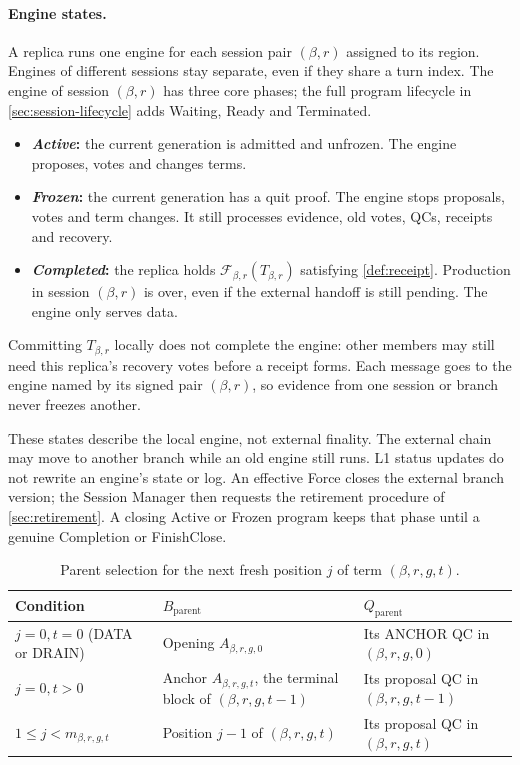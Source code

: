 \documentclass[11pt,a4paper]{article}
\newcommand{\FC}{\mathcal F}
\newcommand{\defterm}[1]{\textcolor{rrBlue}{\textit{#1}}}
\begin{document}
\paragraph{Engine states.}
A replica runs one engine for each session pair $(\beta,r)$ assigned to
its region. Engines of different sessions stay separate, even if they
share a turn index. The engine of session $(\beta,r)$ has three core
phases; the full program lifecycle in \cref{sec:session-lifecycle} adds
Waiting, Ready and Terminated.
\begin{itemize}
\item \textbf{\defterm{Active}:} the current generation is admitted and
unfrozen. The engine proposes, votes and changes terms.
\item \textbf{\defterm{Frozen}:} the current generation has a quit proof.
The engine stops proposals, votes and term changes. It still processes
evidence, old votes, QCs, receipts and recovery.
\item \textbf{\defterm{Completed}:} the replica holds
$\FC_{\beta,r}(T_{\beta,r})$ satisfying \cref{def:receipt}. Production in
session $(\beta,r)$ is over, even if the external handoff is still
pending. The engine only serves data.
\end{itemize}
Committing $T_{\beta,r}$ locally does not complete the engine: other
members may still need this replica's recovery votes before a receipt
forms. Each message goes to the engine named by its signed pair
$(\beta,r)$, so evidence from one session or branch never freezes
another.

These states describe the local engine, not external finality. The
external chain may move to another branch while an old engine still
runs. L1 status updates do not rewrite an engine's state or log. An
effective Force closes the external branch version; the Session Manager
then requests the retirement procedure of \cref{sec:retirement}. A
closing Active or Frozen program keeps that phase until a genuine
Completion or FinishClose.

\begin{table}[htbp]\centering\small
\caption{Parent selection for the next fresh position $j$ of term $(\beta,r,g,t)$.}
\label{tab:parent}
\begin{tabularx}{\linewidth}{@{}l Y Y@{}}
\toprule
Condition & $B_{\mathrm{parent}}$ & $Q_{\mathrm{parent}}$\\
\midrule
$j=0,t=0$ (DATA or DRAIN) & Opening $A_{\beta,r,g,0}$ & Its ANCHOR QC in $(\beta,r,g,0)$\\
$j=0,t>0$ & Anchor $A_{\beta,r,g,t}$, the terminal block of $(\beta,r,g,t-1)$ & Its proposal QC in $(\beta,r,g,t-1)$\\
$1\le j<m_{\beta,r,g,t}$ & Position $j-1$ of $(\beta,r,g,t)$ & Its proposal QC in $(\beta,r,g,t)$\\
\bottomrule
\end{tabularx}
\end{table}
\end{document}
